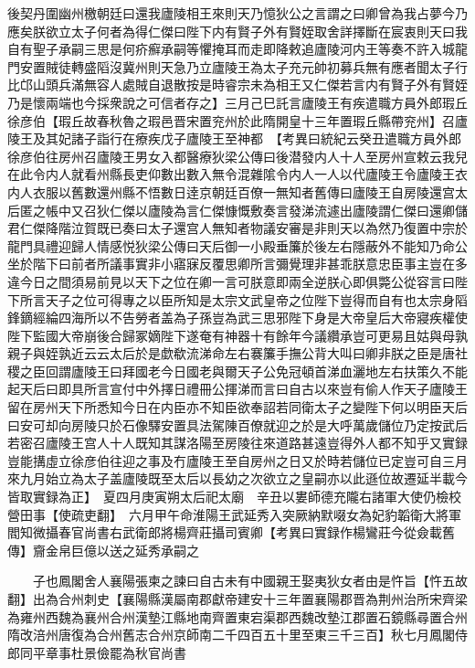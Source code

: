 後契丹圍幽州檄朝廷曰還我廬陵相王來則天乃憶狄公之言謂之曰卿曾為我占夢今乃應矣朕欲立太子何者為得仁傑曰陛下内有賢子外有賢姪取舍詳擇斷在宸衷則天曰我自有聖子承嗣三思是何疥癬承嗣等懼掩耳而走即降敕追廬陵河内王等奏不許入城龍門安置賊徒轉盛䧟沒冀州則天急乃立廬陵王為太子充元帥初募兵無有應者聞太子行比邙山頭兵滿無容人處賊自退散按是時睿宗未為相王又仁傑若言内有賢子外有賢姪乃是懷兩端也今採衆說之可信者存之】三月己巳託言廬陵王有疾遣職方員外郎瑕丘徐彦伯【瑕丘故春秋魯之瑕邑晋宋置兖州於此隋開皇十三年置瑕丘縣帶兖州】召廬陵王及其妃諸子詣行在療疾戊子廬陵王至神都　【考異曰統紀云癸丑遣職方員外郎徐彦伯往房州召廬陵王男女入都醫療狄梁公傳曰後潜發内人十人至房州宣敕云我兒在此令内人就看州縣長吏仰數出數入無令混雜隂令内人一人以代廬陵王令廬陵王衣内人衣服以舊數還州縣不悟數日逹京朝廷百僚一無知者舊傳曰廬陵王自房陵還宫太后匿之帳中又召狄仁傑以廬陵為言仁傑慷慨敷奏言發涕流遽出廬陵謂仁傑曰還卿儲君仁傑降階泣賀既已奏曰太子還宫人無知者物議安審是非則天以為然乃復置中宗於龍門具禮迎歸人情感悦狄梁公傳曰天后御一小殿垂簾於後左右隱蔽外不能知乃命公坐於階下曰前者所議事實非小寤寐反覆思卿所言彌覺理非甚乖朕意忠臣事主豈在多違今日之間須易前見以天下之位在卿一言可朕意即兩全逆朕心即俱斃公從容言曰陛下所言天子之位可得專之以臣所知是太宗文武皇帝之位陛下豈得而自有也太宗身䧟鋒鏑經綸四海所以不告勞者盖為子孫豈為武三思邪陛下身是大帝皇后大帝寢疾權使陛下監國大帝崩後合歸冢嫡陛下遂奄有神器十有餘年今議纘承豈可更易且姑與母孰親子與姪孰近云云太后於是歔欷流涕命左右褰簾手撫公背大叫曰卿非朕之臣是唐社稷之臣回謂廬陵王曰拜國老今日國老與爾天子公免冠頓首涕血灑地左右扶策久不能起天后曰即具所言宣付中外擇日禮冊公揮涕而言曰自古以來豈有偷人作天子廬陵王留在房州天下所悉知今日在内臣亦不知臣欲奉詔若同衛太子之變陛下何以明臣天后曰安可却向房陵只於石像驛安置具法駕陳百僚就迎之於是大呼萬歲儲位乃定按武后若密召廬陵王宫人十人既知其謀洛陽至房陵往來道路甚遠豈得外人都不知乎又實録豈能搆虛立徐彦伯往迎之事及冇廬陵王至自房州之日又於時若儲位已定豈可自三月來九月始立為太子盖廬陵既至太后以長幼之次欲立之皇嗣亦以此遜位故遷延半載今皆取實録為正】　夏四月庚寅朔太后祀太廟　辛丑以婁師德充隴右諸軍大使仍檢校營田事【使疏吏翻】　六月甲午命淮陽王武延秀入突厥納默啜女為妃豹韜衛大將軍閻知微攝春官尚書右武衛郎將楊齊莊攝司賓卿【考異曰實録作楊鸞莊今從僉載舊傳】齎金帛巨億以送之延秀承嗣之

　　子也鳳閣舍人襄陽張柬之諫曰自古未有中國親王娶夷狄女者由是忤旨【忤五故翻】出為合州刺史【襄陽縣漢屬南郡獻帝建安十三年置襄陽郡晋為荆州治所宋齊梁為雍州西魏為襄州合州漢墊江縣地南齊置東宕渠郡西魏改墊江郡置石鏡縣尋置合州隋改涪州唐復為合州舊志合州京師南二千四百五十里至東三千三百】秋七月鳳閣侍郎同平章事杜景儉罷為秋官尚書

